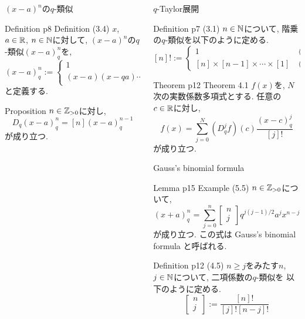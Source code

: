 \documentclass[unicode,mathserif]{beamer}
\newcommand{\qcoe}[2]{\left[\begin{array}{ccc}#1\\#2\end{array}\right]}
\begin{document}
\begin{frame}[fragile]
\begin{columns}[T]
\begin{column}{0.33\columnwidth}
		\begin{block}{$(x - a)^n$の$q$-類似}
			\begin{itembox}{Definition \cite{Kac} p8 Definition (3.4)}
			$x$, $a \in \mathbb R$, $n \in \mathbb N$に対して, $(x - a)^n$の$q$-類似$(x - a)^n_q$を, 
			\[
				(x - a)^n_q := \begin{cases}
					1 & \text{if}\ n = 0 \\
					(x - a) (x - qa) \cdots (x - q^{n - 1} a) & \text{if}\ n \ge 1
				\end{cases}
			\]
			と定義する.
			\end{itembox}
			\begin{itembox}{Proposition}
			$n\in\mathbb Z_{>0}$に対し, 
			\[
				D_q(x-a)^n_q = [n](x-a)^{n-1}_q
			\]
			が成り立つ.
			\end{itembox}
		\end{block}
	\end{column}

	\begin{column}{0.33\columnwidth}
		\begin{block}{$q$-Taylor展開}
			\begin{itembox}{Definition \cite{Kac} p7 (3.1)}
				$n \in \mathbb N$について, 階乗の$q$-類似を以下のように定める. 
				\[
					[n]! := \begin{cases}
													1 & (n=0)\\
													[n]\times[n-1]\times\cdots\times[1] & (n\ge1)
												\end{cases}
				\]
			\end{itembox}
			\begin{itembox}{Theorem \cite{Kac} p12 Theorem 4.1}
				$f(x)$を, $N$次の実数係数多項式とする. 任意の$c\in\mathbb R$に対し, 
				\[
					f(x) = \sum_{j=0}^N (D_q^jf)(c)\frac{(x-c)^j_q}{[j]!}
				\]
				が成り立つ.
			\end{itembox}
		\end{block}
      
		\begin{block}{Gauss's binomial formula}
			\begin{itembox}{Lemma \cite{Kac} p15 Example (5.5)}
				$n \in \mathbb Z_{>0}$について, 
				\[
					(x + a)^n_q = \sum_{j = 0}^n \qcoe{n}{j} q^{j (j - 1)/2} a^j x^{n - j}
				\]
				が成り立つ. この式は Gauss's binomial formula と呼ばれる.
			\end{itembox}
			\begin{itembox}{Definition \cite{Kac} p12 (4.5)}
				$n \ge j$をみたす$n$, $j \in \mathbb N$について, 二項係数の$q$-類似を
				以下のように定める. 
				\[
					\qcoe{n}{j} := \frac{[n]!}{[j]![n - j]!}
				\]
			\end{itembox}
		\end{block}
		

\end{column}
\end{columns}
\end{frame}
\end{document}

